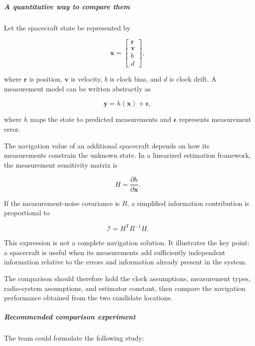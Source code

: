 \subparagraph{A quantitative way to compare them}

Let the spacecraft state be represented by

\[
	\mathbf{x}
	=
	\begin{bmatrix}
		\mathbf{r} \\
		\mathbf{v} \\
		b          \\
		d
	\end{bmatrix},
\]

where \(\mathbf{r}\) is position, \(\mathbf{v}\) is velocity,
\(b\) is clock bias, and \(d\) is clock drift. A measurement
model can be written abstractly as

\[
	\mathbf{y}
	=
	h(\mathbf{x})+\boldsymbol{\epsilon},
\]

where \(h\) maps the state to predicted measurements and
\(\boldsymbol{\epsilon}\) represents measurement error.

The navigation value of an additional spacecraft depends on
how its measurements constrain the unknown state. In a
linearized estimation framework, the measurement sensitivity
matrix is

\[
	H
	=
	\frac{\partial h}{\partial \mathbf{x}}.
\]

If the measurement-noise covariance is \(R\), a simplified
information contribution is proportional to

\[
	\mathcal{I}
	=
	H^{\mathsf T}R^{-1}H.
\]

This expression is not a complete navigation solution. It
illustrates the key point: a spacecraft is useful when its
measurements add sufficiently independent information relative
to the errors and information already present in the system.

The comparison should therefore hold the clock assumptions,
measurement types, radio-system assumptions, and estimator
constant, then compare the navigation performance obtained
from the two candidate locations.

\subparagraph{Recommended comparison experiment}

The team could formulate the following study:

